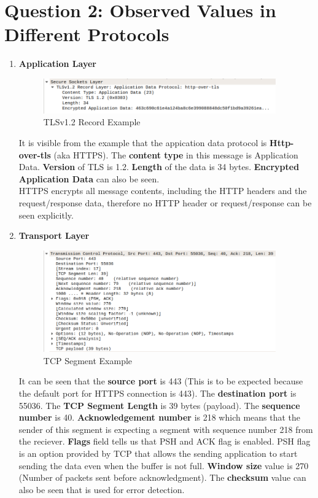 \documentclass[a4paper,10pt]{article}
\newlength{\strutheight}
\begin{document}
\section*{Question 2: Observed Values in Different Protocols}
\begin{enumerate}
	\item \textbf{\color{Magenta} \large Application Layer}\\
	\begin{adjustbox}{valign=T,raise=\strutheight,minipage={\linewidth}}
		\begin{figure}
			\includegraphics[width=10cm]{Images/AppEx}
			\caption{TLSv1.2 Record Example}
		\end{figure}
		\strut{}
		It is visible from the example that the appication data protocol is \textbf{Http-over-tls} (aka HTTPS). The \textbf{content type} in this message is Application Data. \textbf{Version }of TLS is 1.2. \textbf{Length} of the data is 34 bytes. \textbf{Encrypted Application Data} can also be seen. 
		\\HTTPS encrypts all message contents, including the HTTP headers and the request/response data, therefore no HTTP header or request/response can be seen explicitly.
	\end{adjustbox}
	\item \textbf{\color{Magenta} \large Transport Layer }\\
	\begin{adjustbox}{valign=T,raise=\strutheight,minipage={\linewidth}}
		\begin{figure}
			\includegraphics[width=10cm]{Images/TcpEx}
			\caption{TCP Segment Example}
		\end{figure}
		\strut{}
		It can be seen that the \textbf{source port} is 443 (This is to be expected because the default port for HTTPS connection is 443). The \textbf{destination port} is 55036. The \textbf{TCP Segment Length} is 39 bytes (payload). The \textbf{sequence number} is 40. \textbf{Acknowledgement number} is 218 which means that the sender of this segment is expecting a segment with sequence number 218 from the reciever. \textbf{Flags} field tells us that PSH and ACK flag is enabled. PSH flag is an option provided by TCP that allows the sending application to start sending the data even when the buffer is not full. \textbf{Window size} value is 270 (Number of packets sent before acknowledgment).	The \textbf{checksum} value can also be seen that is used for error detection.

\end{adjustbox}
\end{enumerate}
\end{document}
